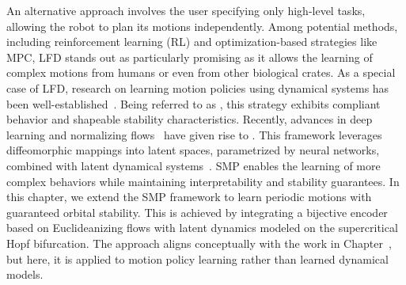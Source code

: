 \begin{foreword}
    An alternative approach involves the user specifying only high-level tasks, allowing the robot to plan its motions independently. Among potential methods, including reinforcement learning (RL) and optimization-based strategies like \gls{MPC}, \gls{LFD} stands out as particularly promising as it allows the learning of complex motions from humans or even from other biological crates. As a special case of \gls{LFD}, research on learning motion policies using dynamical systems has been well-established~\cite{ijspeert2013dynamical}. Being referred to as , this strategy exhibits compliant behavior and shapeable stability characteristics. Recently, advances in deep learning and normalizing flows~\cite{kobyzev2020normalizing} have given rise to . This framework leverages diffeomorphic mappings into latent spaces, parametrized by neural networks, combined with latent dynamical systems~\cite{rana2020euclideanizing, perez2023stable, zhi2024teaching}. \gls{SMP} enables the learning of more complex behaviors while maintaining interpretability and stability guarantees.
    In this chapter, we extend the \gls{SMP} framework to learn periodic motions with guaranteed orbital stability. This is achieved by integrating a bijective encoder based on Euclideanizing flows with latent dynamics modeled on the supercritical Hopf bifurcation. The approach aligns conceptually with the work in Chapter~\circled{\ref{chp:con}}, but here, it is applied to motion policy learning rather than learned dynamical models.
\end{foreword}


\pagebreak

